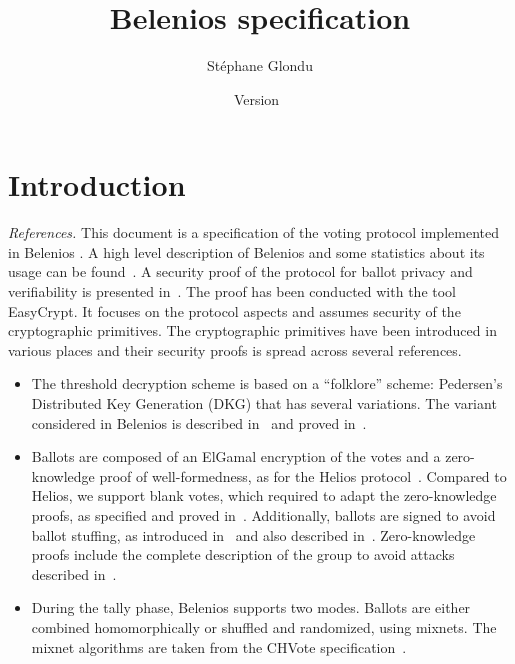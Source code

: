 \documentclass[a4paper]{article}
\title{Belenios specification}
\date{Version~\version}
\author{Stéphane Glondu}
\newcommand{\version}{}
\begin{document}
\maketitle
\tableofcontents

\section{Introduction}
{\it References.}
This document is a specification of the voting protocol implemented in
Belenios \version.
A high level description of Belenios and some statistics about its
usage can be found~\cite{Belenios-Meadows2019}.
A security proof of the protocol for ballot privacy and verifiability
is presented in~\cite{Belenios-Easycrypt-CSF18}. The proof has been conducted with the
tool EasyCrypt. It focuses on the protocol aspects and assumes
security of the cryptographic primitives.
The cryptographic primitives have been introduced in various places
and their security proofs is spread across several references.
\begin{itemize}
\item 
The threshold decryption scheme is
based on a ``folklore'' scheme:
Pedersen’s~\cite{Pedersen} Distributed Key Generation (DKG) that has several variations.
The variant considered in Belenios is described in~\cite{wpes2013} and
proved in~\cite{wpes2013,asiacrypt12}.
\item Ballots are composed of an ElGamal encryption of the votes and a
  zero-knowledge proof of well-formedness, as for the Helios
  protocol~\cite{Helios}. Compared to Helios, we support blank votes,
  which required to adapt the zero-knowledge proofs, as specified and
  proved in~\cite{note-Pierrick}. Additionally, ballots are signed to
  avoid ballot stuffing, as introduced in~\cite{CGGI-esorics14} and also
  described in~\cite{Belenios-Meadows2019}.
  Zero-knowledge proofs include the complete description of the group
  to avoid attacks described in~\cite{EVoteID20-Belenios}.
  \item During the tally phase, Belenios supports two modes. Ballots are either combined
    homomorphically or shuffled and randomized, using mixnets. The
    mixnet algorithms are taken from the CHVote specification~\cite{CHVote}.
\end{itemize}

\end{document}
